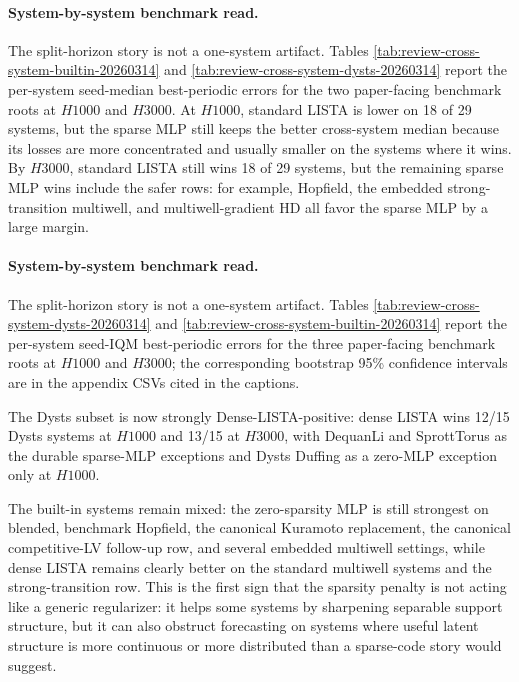 \paragraph{System-by-system benchmark read.}
The split-horizon story is not a one-system artifact. Tables
\ref{tab:review-cross-system-builtin-20260314} and
\ref{tab:review-cross-system-dysts-20260314} report the per-system seed-median
best-periodic errors for the two paper-facing benchmark roots at $H1000$ and
$H3000$. At $H1000$, standard LISTA is lower on 18 of 29 systems, but the
sparse MLP still keeps the better cross-system median because its losses are
more concentrated and usually smaller on the systems where it wins. By
$H3000$, standard LISTA still wins 18 of 29 systems, but the remaining sparse
MLP wins include the safer rows: for example, Hopfield, the embedded
strong-transition multiwell, and multiwell-gradient HD all favor the sparse MLP
by a large margin.





\paragraph{System-by-system benchmark read.}
The split-horizon story is not a one-system artifact. Tables
\ref{tab:review-cross-system-dysts-20260314} and
\ref{tab:review-cross-system-builtin-20260314} report the per-system seed-IQM
best-periodic errors for the three paper-facing benchmark roots at $H1000$ and
$H3000$; the corresponding bootstrap 95\% confidence intervals are in the
appendix CSVs cited in the captions. 

The Dysts subset is now strongly
Dense-LISTA-positive: dense LISTA wins 12/15 Dysts systems at $H1000$ and
13/15 at $H3000$, with DequanLi and SprottTorus as the durable sparse-MLP
exceptions and Dysts Duffing as a zero-MLP exception only at $H1000$. 

The
built-in systems remain mixed: the zero-sparsity MLP is still strongest on
blended, benchmark Hopfield, the canonical Kuramoto replacement, the canonical
competitive-LV follow-up row, and several embedded multiwell settings, while
dense LISTA remains clearly better on the standard multiwell systems and the
strong-transition row. This is the first sign that the
sparsity penalty is not acting like a generic regularizer: it helps some
systems by sharpening separable support structure, but it can also obstruct
forecasting on systems where useful latent structure is more continuous or more
distributed than a sparse-code story would suggest. 

